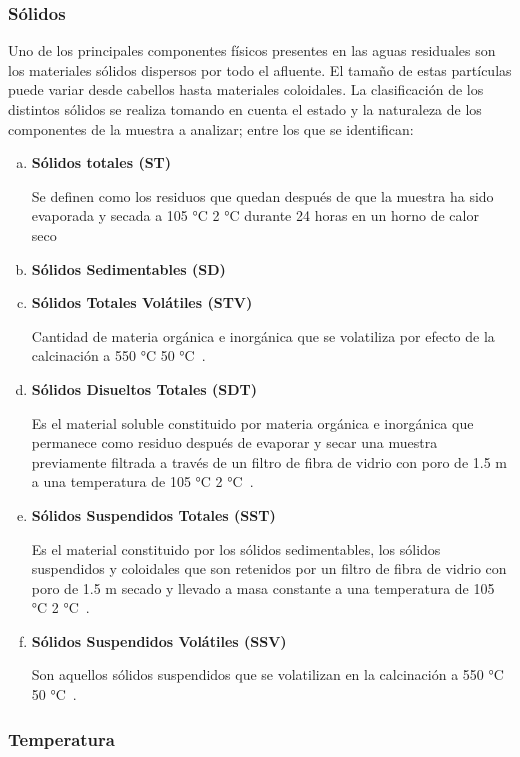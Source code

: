\subsubsection{Sólidos}
Uno de los principales componentes físicos presentes en las aguas residuales son los materiales sólidos dispersos por todo el afluente. El tamaño de estas partículas puede variar desde cabellos hasta materiales coloidales. La clasificación de los distintos sólidos se realiza tomando en cuenta el estado y la naturaleza de los componentes de la muestra a analizar; entre los que se identifican:
\begin{enumerate}[a.]
	\item \textbf{Sólidos totales (ST)}\par
	Se definen como los residuos que quedan después de que la muestra ha sido evaporada y secada a 105 °C  2 °C durante 24 horas en un horno de calor seco~\citep{Economia2015}
	\item \textbf{Sólidos Sedimentables (SD)} \par
	
	\item \textbf{Sólidos Totales Volátiles (STV)} \par
	Cantidad de materia orgánica e inorgánica que se volatiliza por efecto de la calcinación a 550 °C  50 °C~\citep{Economia2015}.
	\item \textbf{Sólidos Disueltos Totales (SDT)} \par
	Es el material soluble constituido por materia orgánica e inorgánica que permanece como residuo después de evaporar y secar una muestra previamente filtrada a través de un filtro de fibra de vidrio con poro de 1.5 m a una temperatura de 105 °C  2 °C~\citep{Economia2015}.
	\item \textbf{Sólidos Suspendidos Totales (SST)} \par
	Es el material constituido por los sólidos sedimentables, los sólidos  suspendidos y coloidales que son retenidos por un filtro de fibra de vidrio con poro de 1.5 m secado y llevado a masa constante a una temperatura de 105 °C  2 °C~\citep{Economia2015}.
	\item \textbf{Sólidos Suspendidos Volátiles (SSV)} \par                
	Son aquellos sólidos suspendidos que se volatilizan en la calcinación a 550 °C  50 °C~\citep{Economia2015}.
\end{enumerate}
\subsubsection{Temperatura}
